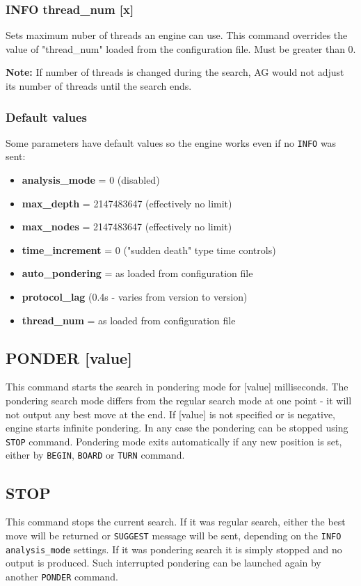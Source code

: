 \documentclass[12pt,a4paper]{article}
\begin{document}
\subsubsection{INFO thread{\_}num [x]}
Sets maximum nuber of threads an engine can use. This command overrides the value of "thread{\_}num" loaded from the configuration file. Must be greater than 0. 

\textbf{Note:} If number of threads is changed during the search, AG would not adjust its number of threads until the search ends.

\subsubsection{Default values}
Some parameters have default values so the engine works even if no \texttt{INFO} was sent:
\begin{itemize}
\item{\textbf{analysis{\_}mode} = 0 (disabled)}
\item{\textbf{max{\_}depth } = 2147483647 (effectively no limit)}
\item{\textbf{max{\_}nodes} = 2147483647 (effectively no limit)}
\item{\textbf{time{\_}increment} = 0 ("sudden death" \cite{suddendeath} type time controls)}
\item{\textbf{auto{\_}pondering} = as loaded from configuration file}
\item{\textbf{protocol{\_}lag}  (0.4s - varies from version to version)}
\item{\textbf{thread{\_}num} = as loaded from configuration file}
\end{itemize}


\subsection{PONDER [value]}
\label{cmd_ponder}
This command starts the search in pondering mode for [value] milliseconds. The pondering search mode differs from the regular search mode at one point - it will not output any best move at the end. If [value] is not specified or is negative, engine starts infinite pondering. In any case the pondering can be stopped using \texttt{STOP} command. Pondering mode exits automatically if any new position is set, either by \texttt{BEGIN}, \texttt{BOARD} or \texttt{TURN} command.


\subsection{STOP}
\label{cmd_stop}
This command stops the current search. If it was regular search, either the best move will be returned or \texttt{SUGGEST} message will be sent, depending on the \texttt{INFO analysis{\_}mode} settings. If it was pondering search it is simply stopped and no output is produced. Such interrupted pondering can be launched again by another \texttt{PONDER} command.
\end{document}
